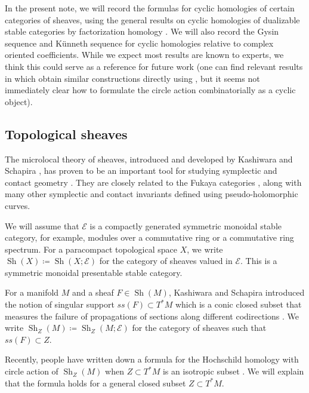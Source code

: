 \documentclass[11pt]{amsart}
\numberwithin{equation}{section}
\theoremstyle{plain}
\theoremstyle{definition}
\theoremstyle{remark}
\newcommand{\cE} { {\mathcal{E}}}
\newcommand{\Sh} { {\operatorname{Sh}}}
\begin{document}
In the present note, we will record the formulas for cyclic homologies of certain categories of sheaves, using the general results on cyclic homologies of dualizable stable categories by factorization homology \cite{Ayala-Francis-FH,AMGR-FH-enriched,Ayala-Francis-FH-dim1}. We will also record the Gysin sequence and K\"unneth sequence for cyclic homologies relative to complex oriented coefficients. While we expect most results are known to experts, we think this could serve as a reference for future work (one can find relevant results in \cite{toen_vezzosi_15,Ben-Zvi-Nadler-trace,Hoyois-Scherotzke-Sibilla} which obtain similar constructions directly using \cite{Lurie-cobordism}, but it seems not immediately clear how to formulate the circle action combinatorially as a cyclic object).




\subsection{Topological sheaves}
The microlocal theory of sheaves, introduced and developed by Kashiwara and Schapira \cite{KS90}, has proven to be an important tool for studying symplectic and contact geometry \cite{nadler2009constructible,tamarkin2013}. They are closely related to the Fukaya categories \cite{nadler2009constructible,GPS3}, along with many other symplectic and contact invariants defined using pseudo-holomorphic curves.

We will assume that $\cE$ is a compactly generated symmetric monoidal stable category, for example, modules over a commutative ring or a commutative ring spectrum. For a paracompact topological space $X$, we write $\Sh(X) \coloneqq \Sh(X; \cE)$ for the category of sheaves valued in $\cE$. This is a symmetric monoidal presentable stable category.

For a manifold $M$ and a sheaf $F \in \Sh(M)$, Kashiwara and Schapira introduced the notion of singular support $ss(F) \subset T^*M$ which is a conic closed subset that measures the failure of propagations of sections along different codirections \cite{KS90}. We write $\Sh_Z(M) \coloneqq \Sh_Z(M; \cE)$ for the category of sheaves such that $ss(F) \subset Z$. 

Recently, people have written down a formula for the Hochschild homology with circle action of $\Sh_Z(M)$ when $Z \subset T^*M$ is an isotropic subset \cite{Kuo-Li-CY}. We will explain that the formula holds for a general closed subset $Z \subset T^*M$.
\end{document}
